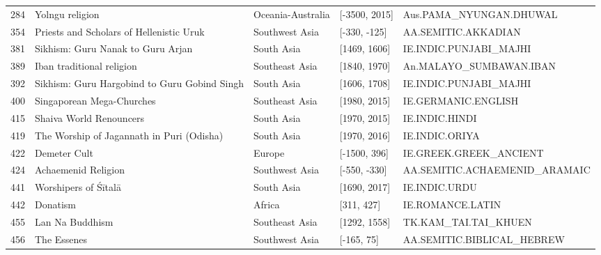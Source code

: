 {\begin{longtable}{rp{3.5cm}llp{3.5cm}}
284 & {\raggedright Yolngu religion} & Oceania-Australia & [-3500, 2015] & {\raggedright Aus.\allowbreak{}PAMA\_\allowbreak{}NYUNGAN.\allowbreak{}DHUWAL} \\
354 & {\raggedright Priests and Scholars of Hellenistic Uruk} & Southwest Asia & [-330, -125] & {\raggedright AA.\allowbreak{}SEMITIC.\allowbreak{}AKKADIAN} \\
381 & {\raggedright Sikhism: Guru Nanak to Guru Arjan} & South Asia & [1469, 1606] & {\raggedright IE.\allowbreak{}INDIC.\allowbreak{}PUNJABI\_\allowbreak{}MAJHI} \\
389 & {\raggedright Iban traditional religion} & Southeast Asia & [1840, 1970] & {\raggedright An.\allowbreak{}MALAYO\_\allowbreak{}SUMBAWAN.\allowbreak{}IBAN} \\
392 & {\raggedright Sikhism: Guru Hargobind to Guru Gobind Singh} & South Asia & [1606, 1708] & {\raggedright IE.\allowbreak{}INDIC.\allowbreak{}PUNJABI\_\allowbreak{}MAJHI} \\
400 & {\raggedright Singaporean Mega-Churches} & Southeast Asia & [1980, 2015] & {\raggedright IE.\allowbreak{}GERMANIC.\allowbreak{}ENGLISH} \\
415 & {\raggedright Shaiva World Renouncers} & South Asia & [1970, 2015] & {\raggedright IE.\allowbreak{}INDIC.\allowbreak{}HINDI} \\
419 & {\raggedright The Worship of Jagannath in Puri (Odisha)} & South Asia & [1970, 2016] & {\raggedright IE.\allowbreak{}INDIC.\allowbreak{}ORIYA} \\
422 & {\raggedright Demeter Cult} & Europe & [-1500, 396] & {\raggedright IE.\allowbreak{}GREEK.\allowbreak{}GREEK\_\allowbreak{}ANCIENT} \\
424 & {\raggedright Achaemenid Religion} & Southwest Asia & [-550, -330] & {\raggedright AA.\allowbreak{}SEMITIC.\allowbreak{}ACHAEMENID\_\allowbreak{}ARAMAIC} \\
441 & {\raggedright Worshipers of Śītalā} & South Asia & [1690, 2017] & {\raggedright IE.\allowbreak{}INDIC.\allowbreak{}URDU} \\
442 & {\raggedright Donatism} & Africa & [311, 427] & {\raggedright IE.\allowbreak{}ROMANCE.\allowbreak{}LATIN} \\
455 & {\raggedright Lan Na Buddhism} & Southeast Asia & [1292, 1558] & {\raggedright TK.\allowbreak{}KAM\_\allowbreak{}TAI.\allowbreak{}TAI\_\allowbreak{}KHUEN} \\
456 & {\raggedright The Essenes} & Southwest Asia & [-165, 75] & {\raggedright AA.\allowbreak{}SEMITIC.\allowbreak{}BIBLICAL\_\allowbreak{}HEBREW} \\

\end{longtable}}
